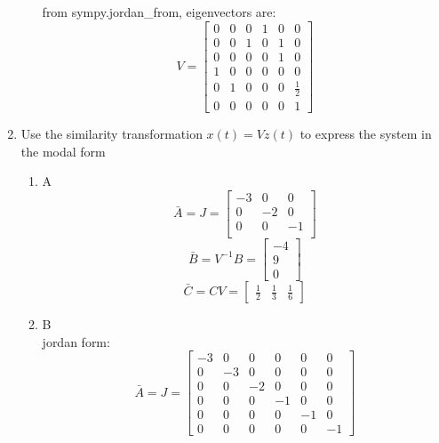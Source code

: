 \begin{enumerate}
\begin{enumerate}
      from sympy.jordan\_from, eigenvectors are:
      \begin{equation}
        V = 
        \left[\begin{matrix}0 & 0 & 0 & 1 & 0 & 0\\0 & 0 & 1 & 0 & 1 & 0\\0 & 0 & 0 & 0 & 1 & 0\\1 & 0 & 0 & 0 & 0 & 0\\0 & 1 & 0 & 0 & 0 & \frac{1}{2}\\0 & 0 & 0 & 0 & 0 & 1\end{matrix}\right]
      \end{equation}
    \end{enumerate}
  \item Use the similarity transformation $x(t) = Vz(t)$ to express the system in the modal form\\
    \begin{enumerate}
    \item A\\
      \begin{equation}
        \bar A = J =
        \begin{bmatrix}
          -3 & 0 & 0 \\
          0 & -2 & 0 \\
          0 & 0 & -1 \\
        \end{bmatrix}
      \end{equation}
      \begin{equation}
        \bar B = V^{-1}B = 
        \begin{bmatrix}
          -4 \\
          9 \\
          0
        \end{bmatrix}
      \end{equation}
      \begin{equation}
        \bar C = CV = 
        \begin{bmatrix}
          \frac 1 2 & \frac 1 3 & \frac 1 6
        \end{bmatrix}
      \end{equation}
    \item B\\
      jordan form:
      \begin{equation}
        \bar A = J = 
        \left[\begin{matrix}-3 & 0 & 0 & 0 & 0 & 0\\0 & -3 & 0 & 0 & 0 & 0\\0 & 0 & -2 & 0 & 0 & 0\\0 & 0 & 0 & -1 & 0 & 0\\0 & 0 & 0 & 0 & -1 & 0\\0 & 0 & 0 & 0 & 0 & -1\end{matrix}\right]

\end{equation}
\end{enumerate}
\end{enumerate}
